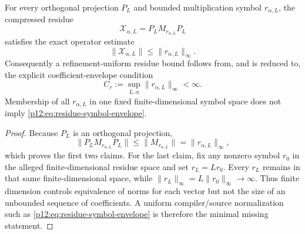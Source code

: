 \documentclass[12pt,a4paper]{article}
\begin{document}
\begin{lemma}
\label{p12:lem:native-residue-bound}
For every orthogonal projection \(P_L\) and bounded multiplication symbol \(r_{\alpha,L}\), the compressed residue
\begin{equation}
\label{p12:eq:residue-compiler-map}
\mathcal X_{\alpha,L}=P_LM_{r_{\alpha,L}}P_L
\end{equation}
satisfies the exact operator estimate
\begin{equation}
\label{p12:eq:native-residue-uniform-bound}
\|\mathcal X_{\alpha,L}\|\le \|r_{\alpha,L}\|_\infty.
\end{equation}
Consequently a refinement-uniform residue bound follows from, and is reduced to, the explicit coefficient-envelope condition
\begin{equation}
\label{p12:eq:residue-symbol-envelope}
C_r:=\sup_{L,\alpha}\|r_{\alpha,L}\|_\infty<\infty.
\end{equation}
Membership of all \(r_{\alpha,L}\) in one fixed finite-dimensional symbol space does not imply \eqref{p12:eq:residue-symbol-envelope}.
\end{lemma}
\begin{proof}
Because \(P_L\) is an orthogonal projection,
\[
\|P_LM_{r_{\alpha,L}}P_L\|\le\|M_{r_{\alpha,L}}\|=\|r_{\alpha,L}\|_\infty,
\]
which proves the first two claims.  For the last claim, fix any nonzero symbol \(r_0\) in the alleged finite-dimensional residue space and set \(r_L=Lr_0\).  Every \(r_L\) remains in that same finite-dimensional space, while \(\|r_L\|_\infty=L\|r_0\|_\infty\to\infty\).  Thus finite dimension controls equivalence of norms for each vector but not the size of an unbounded sequence of coefficients.  A uniform compiler/source normalization such as \eqref{p12:eq:residue-symbol-envelope} is therefore the minimal missing statement.
\end{proof}
\end{document}
